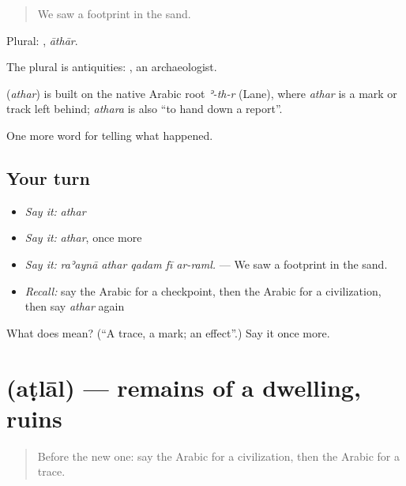 \begin{quote}
We saw a footprint in the sand.
\end{quote}

Plural: , \emph{āthār}.

The plural  is antiquities:  , an archaeologist.

\begin{cousinweb}
\textbf{} (\emph{athar}) is built on the native Arabic root \emph{ʾ-th-r} (Lane), where \emph{athar} is a mark or track left behind; \emph{athara} is also \textquotedblleft{}to hand down a report\textquotedblright{}.
\end{cousinweb}

\begin{grammarlens}[title={What you've built}]
One more word for telling what happened.
\end{grammarlens}

\subsection*{Your turn}
\begin{itemize}
\raggedright
  \item \emph{Say it:} \emph{athar}
  \item \emph{Say it:} \emph{athar}, once more
  \item \emph{Say it:} \emph{raʾaynā athar qadam fī ar-raml.} — We saw a footprint in the sand.
  \item \emph{Recall:} say the Arabic for a checkpoint, then the Arabic for a civilization, then say \emph{athar} again
\end{itemize}

\begin{tcolorbox}[breakable,colback=teal!4,colframe=teal!35!black,title={Before you move on}]
What does  mean? (\textquotedblleft{}A trace, a mark; an effect\textquotedblright{}.) Say it once more.
\end{tcolorbox}
\section[\texorpdfstring{\ar{أطلال} (aṭlāl)}{أطلال (aṭlāl)}]{ (aṭlāl) — remains of a dwelling, ruins}

\label{lesson:AR-C318-atlal}



\begin{quote}
Before the new one: say the Arabic for a civilization, then the Arabic for a trace.
\end{quote}

